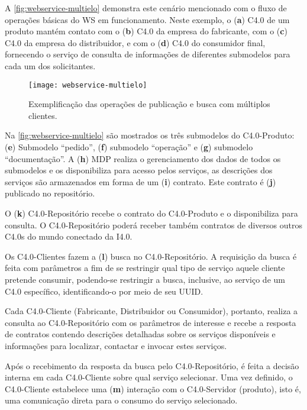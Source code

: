 A \autoref{fig:webservice-multielo} demonstra este cenário mencionado com o fluxo de operações básicas do WS em funcionamento. Neste exemplo, o (\textbf{a}) C4.0 de um produto mantém contato com o (\textbf{b}) C4.0 da empresa do fabricante, com o (\textbf{c}) C4.0 da empresa do distribuidor, e com o (\textbf{d}) C4.0 do consumidor final, fornecendo o serviço de consulta de informações de diferentes submodelos para cada um dos solicitantes.

\begin{figure}[htb]
	\centering
	\texttt{[image: webservice-multielo]}
	\caption{Exemplificação das operações de publicação e busca com múltiplos clientes.}
	\label{fig:webservice-multielo}
\end{figure}

Na \autoref{fig:webservice-multielo} são mostrados os três submodelos do C4.0-Produto: (\textbf{e}) Submodelo ``pedido'', (\textbf{f}) submodelo ``operação'' e (\textbf{g}) submodelo ``documentação''. A (\textbf{h}) MDP realiza o gerenciamento dos dados de todos os submodelos e os disponibiliza para acesso pelos serviços, as descrições dos serviços são armazenados em forma de um (\textbf{i}) contrato. Este contrato é (\textbf{j}) publicado no repositório.

O (\textbf{k}) C4.0-Repositório recebe o contrato do C4.0-Produto e o disponibiliza para consulta. O C4.0-Repositório poderá receber também contratos de diversos outros C4.0s do mundo conectado da I4.0.

Os C4.0-Clientes fazem a (\textbf{l}) busca no C4.0-Repositório. A requisição da busca é feita com parâmetros a fim de se restringir qual tipo de serviço aquele cliente pretende consumir, podendo-se restringir a busca, inclusive, ao serviço de um C4.0 específico, identificando-o por meio de seu UUID.

Cada C4.0-Cliente (Fabricante, Distribuidor ou Consumidor), portanto, realiza a consulta ao C4.0-Repositório com os parâmetros de interesse e recebe a resposta de contratos contendo descrições detalhadas sobre os serviços disponíveis e informações para localizar, contactar e invocar estes serviços.

Após o recebimento da resposta da busca pelo C4.0-Repositório, é feita a decisão interna em cada C4.0-Cliente sobre qual serviço selecionar. Uma vez definido, o C4.0-Cliente estabelece uma (\textbf{m}) interação com o C4.0-Servidor (produto), isto é, uma comunicação direta para o consumo do serviço selecionado.

